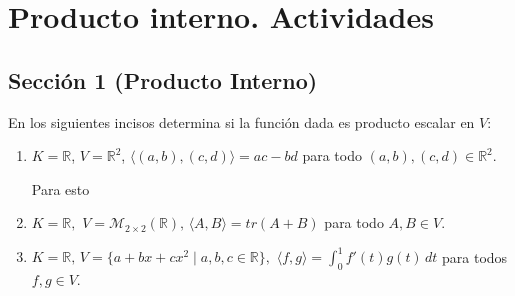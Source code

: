 \section{Producto interno. Actividades}

\subsection{Sección 1 (Producto Interno)}
\begin{exercise}{}{}
    En los siguientes incisos determina si la función dada es producto escalar en $V$:
    
    \begin{enumerate}
        \item $K= \mathbb{R}$, $V = \mathbb{R}^2$, $\langle (a,b),(c,d) \rangle = ac-bd$ para todo $(a,b), (c,d) \in \mathbb{R}^2$.
\begin{solution}{}{}
            Para esto
\end{solution}


        \item $K= \mathbb{R}, \, \, V = \mathcal{M}_{2 \times 2} (\mathbb{R}), \, \langle A, B \rangle = tr(A + B)$ para todo $A, B \in V$.
        \item $K= \mathbb{R}, \, V= \{a+bx+cx^2 \mid a,b,c \in \mathbb{R}\}, \, \, \langle f,g \rangle = \int_{0}^{1}f'(t)g(t) \, dt$ para todos $f,g \in V$.
    \end{enumerate}
    
\end{exercise}

